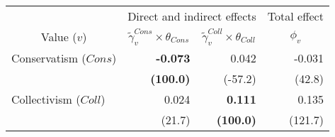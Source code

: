 
\begin{tabular}{lrrr}
\toprule
\multicolumn{1}{c}{ } & \multicolumn{2}{c}{Direct and indirect effects} & \multicolumn{1}{c}{Total effect} \\
\cmidrule(l{3pt}r{3pt}){2-3} \cmidrule(l{3pt}r{3pt}){4-4}
\multicolumn{1}{c}{Value ($v$)} & \multicolumn{1}{c}{$\widetilde{\gamma}^{Cons}_v \times \theta_{Cons}$} & \multicolumn{1}{c}{$\widetilde{\gamma}^{Coll}_v \times \theta_{Coll}$} & \multicolumn{1}{c}{${\phi}_v$}\\
\midrule
Conservatism ($Cons$) & \textbf{-0.073} & 0.042 & -0.031\\
 & \textbf{(100.0)} & (-57.2) & (42.8)\\
Collectivism ($Coll$) & 0.024 & \textbf{0.111} & 0.135\\
 & (21.7) & \textbf{(100.0)} & (121.7)\\
\bottomrule
\end{tabular}
